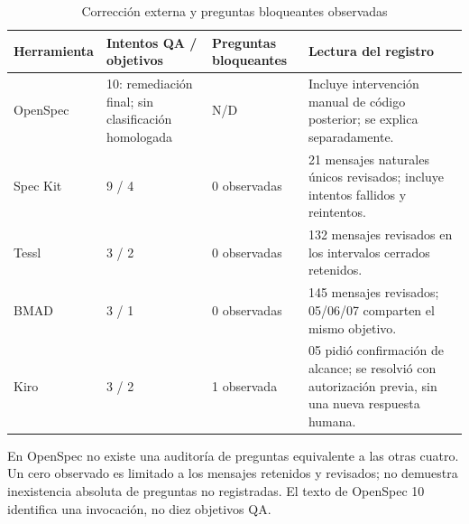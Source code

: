 \begin{table}[H]\centering\small\setlength{\tabcolsep}{4pt}\renewcommand{\arraystretch}{1.06}
\caption{Corrección externa y preguntas bloqueantes observadas}
\label{tab:intervencion_tetris_e2}
\begin{tabularx}{\textwidth}{l Y Y Y}\toprule

\textbf{Herramienta} & \textbf{Intentos QA / objetivos} & \textbf{Preguntas bloqueantes} & \textbf{Lectura del registro} \\ \midrule

OpenSpec & 10: remediación final; sin clasificación homologada & N/D & Incluye intervención manual de código posterior; se explica separadamente. \\

Spec Kit & 9 / 4 & 0 observadas & 21 mensajes naturales únicos revisados; incluye intentos fallidos y reintentos. \\

Tessl & 3 / 2 & 0 observadas & 132 mensajes revisados en los intervalos cerrados retenidos. \\

BMAD & 3 / 1 & 0 observadas & 145 mensajes revisados; 05/06/07 comparten el mismo objetivo. \\

Kiro & 3 / 2 & 1 observada & 05 pidió confirmación de alcance; se resolvió con autorización previa, sin una nueva respuesta humana. \\

\bottomrule\end{tabularx}

\par\smallskip\begin{minipage}{\textwidth}\footnotesize En OpenSpec no existe una auditoría de preguntas equivalente a las otras cuatro. Un cero observado es limitado a los mensajes retenidos y revisados; no demuestra inexistencia absoluta de preguntas no registradas. El texto de OpenSpec 10 identifica una invocación, no diez objetivos QA.\end{minipage}

\end{table}

